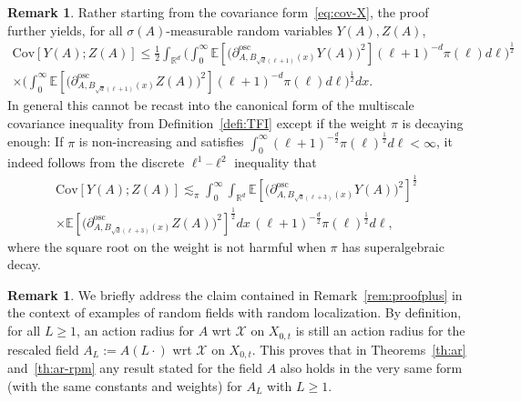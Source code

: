 \documentclass[10pt]{amsart}
\theoremstyle{definition}\newtheorem{defi}[theo]{Definition}\newtheorem{rema}[theo]{Remark}\newtheorem{exam}[theo]{Example}\newtheorem{exem}[theo]{Example}\newtheorem{nota}[theo]{Notation}
\newcommand{\R}{\mathbb R}
\newcommand{\expec}[1]{\mathbb{E}\left[#1 \right]}
\newcommand{\X}{\mathcal X}
\newcommand{\osc}{\partial^{\mathrm{osc}}}
\newcommand{\oscd}[1]{\mathrel{\osc_{#1}}}
\newcommand{\cov}[2]{\mathrm{Cov}\left[#1;#2\right]}
\begin{document}
\begin{rema}\label{rem:cov-alm}
Rather starting from the covariance form~\eqref{eq:cov-X}, the proof further yields, for all $\sigma(A)$-measurable random variables $Y(A),Z(A)$,
\begin{multline*}
\cov{Y(A)}{Z(A)}\le \frac12\int_{\R^d}\bigg(\int_0^\infty\expec{\Big(\oscd{A,B_{\sqrt d(\ell+1)}(x)}Y(A)\Big)^2}(\ell+1)^{-d}\pi(\ell) d\ell\bigg)^\frac12\\
\times\bigg(\int_0^\infty\expec{\Big(\oscd{A,B_{\sqrt d(\ell+1)}(x)}Z(A)\Big)^2}(\ell+1)^{-d}\pi(\ell) d\ell\bigg)^\frac12dx.
\end{multline*}
In general this cannot be recast into the canonical form of the multiscale covariance inequality from Definition~\ref{defi:TFI} except if the weight $\pi$ is decaying enough: If $\pi$ is non-increasing and satisfies $\int_0^\infty(\ell+1)^{-\frac d2}\pi(\ell)^\frac12d\ell<\infty$, it indeed follows from the discrete $\ell^1$--$\ell^2$ inequality that
\begin{multline*}
\cov{Y(A)}{Z(A)}\lesssim_\pi \int_0^\infty\int_{\R^d}\expec{\Big(\oscd{A,B_{\sqrt d(\ell+3)}(x)}Y(A)\Big)^2}^\frac12\\
\times \expec{\Big(\oscd{A,B_{\sqrt d(\ell+3)}(x)}Z(A)\Big)^2}^\frac12dx\,(\ell+1)^{-\frac d2}\pi(\ell)^\frac12 d\ell,
\end{multline*}
where the square root on the weight is not harmful when $\pi$ has superalgebraic decay.
\end{rema}

\begin{rema}\label{rem:rescale-1}
We briefly address the claim contained in Remark~\ref{rem:proofplus} in the context of examples of random fields with random localization. By definition, for all $L\ge1$, an action radius for $A$ wrt $\X$ on $X_{0,t}$ is still an action radius for the rescaled field $A_L:=A(L\cdot)$ wrt $\X$ on $X_{0,t}$. This proves that in Theorems~\ref{th:ar} and~\ref{th:ar-rpm} any result stated for the field $A$ also holds in the very same form (with the same constants and weights) for $A_L$ with $L\ge1$.
\end{rema}
\end{document}

